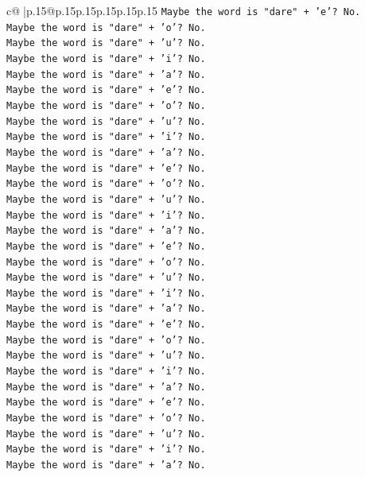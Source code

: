 \documentclass{article}
\begin{document}
{\begin{supertabular}{c@{$\;$}|p{.15\linewidth}@{}p{.15\linewidth}p{.15\linewidth}p{.15\linewidth}p{.15\linewidth}p{.15\linewidth}}
{{{\texttt{Maybe the word is "dare" + 'e'? No.} \\
\texttt{Maybe the word is "dare" + 'o'? No.} \\
\texttt{Maybe the word is "dare" + 'u'? No.} \\
\texttt{Maybe the word is "dare" + 'i'? No.} \\
\texttt{Maybe the word is "dare" + 'a'? No.} \\
\texttt{Maybe the word is "dare" + 'e'? No.} \\
\texttt{Maybe the word is "dare" + 'o'? No.} \\
\texttt{Maybe the word is "dare" + 'u'? No.} \\
\texttt{Maybe the word is "dare" + 'i'? No.} \\
\texttt{Maybe the word is "dare" + 'a'? No.} \\
\texttt{Maybe the word is "dare" + 'e'? No.} \\
\texttt{Maybe the word is "dare" + 'o'? No.} \\
\texttt{Maybe the word is "dare" + 'u'? No.} \\
\texttt{Maybe the word is "dare" + 'i'? No.} \\
\texttt{Maybe the word is "dare" + 'a'? No.} \\
\texttt{Maybe the word is "dare" + 'e'? No.} \\
\texttt{Maybe the word is "dare" + 'o'? No.} \\
\texttt{Maybe the word is "dare" + 'u'? No.} \\
\texttt{Maybe the word is "dare" + 'i'? No.} \\
\texttt{Maybe the word is "dare" + 'a'? No.} \\
\texttt{Maybe the word is "dare" + 'e'? No.} \\
\texttt{Maybe the word is "dare" + 'o'? No.} \\
\texttt{Maybe the word is "dare" + 'u'? No.} \\
\texttt{Maybe the word is "dare" + 'i'? No.} \\
\texttt{Maybe the word is "dare" + 'a'? No.} \\
\texttt{Maybe the word is "dare" + 'e'? No.} \\
\texttt{Maybe the word is "dare" + 'o'? No.} \\
\texttt{Maybe the word is "dare" + 'u'? No.} \\
\texttt{Maybe the word is "dare" + 'i'? No.} \\
\texttt{Maybe the word is "dare" + 'a'? No.} \\
}}}
\end{supertabular}}
\end{document}
